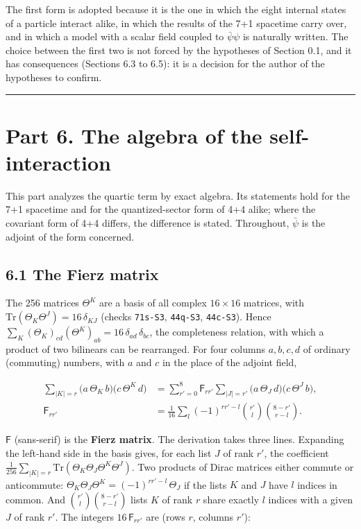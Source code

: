 \documentclass[
  10pt,
]{article}
\begin{document}
The first form is adopted because it is the one in which the eight
internal states of a particle interact alike, in which the results of
the 7+1 spacetime carry over, and in which a model with a scalar field
coupled to \(\bar\psi\psi\) is naturally written. The choice between the
first two is not forced by the hypotheses of Section 0.1, and it has
consequences (Sections 6.3 to 6.5): it is a decision for the author of
the hypotheses to confirm.

\begin{center}\rule{0.5\linewidth}{0.5pt}\end{center}

\hypertarget{part-6.-the-algebra-of-the-self-interaction}{%
\section{Part 6. The algebra of the
self-interaction}\label{part-6.-the-algebra-of-the-self-interaction}}

This part analyzes the quartic term by exact algebra. Its statements
hold for the 7+1 spacetime and for the quantized-sector form of 4+4
alike; where the covariant form of 4+4 differs, the difference is
stated. Throughout, \(\bar\psi\) is the adjoint of the form concerned.

\hypertarget{the-fierz-matrix}{%
\subsection{6.1 The Fierz matrix}\label{the-fierz-matrix}}

The 256 matrices \(\Theta^K\) are a basis of all complex \(16\times16\)
matrices, with \(\mathrm{Tr}(\Theta_K\Theta^J)=16\,\delta_{KJ}\) (checks
\texttt{71s-S3}, \texttt{44q-S3}, \texttt{44c-S3}). Hence
\(\sum_K(\Theta_K)_{cd}(\Theta^K)_{ab}=16\,\delta_{ad}\,\delta_{bc}\),
the completeness relation, with which a product of two bilinears can be
rearranged. For four columns \(a,b,c,d\) of ordinary (commuting)
numbers, with \(a\) and \(c\) in the place of the adjoint field,

\[\begin{aligned}
\sum_{|K|=r}\big(a\,\Theta_K\,b\big)\big(c\,\Theta^K\,d\big)
&=\sum_{r'=0}^{8}\mathsf F_{rr'}\sum_{|J|=r'}\big(a\,\Theta_J\,d\big)\big(c\,\Theta^J\,b\big),\\
\mathsf F_{rr'}&=\frac1{16}\sum_{l}(-1)^{rr'-l}\binom{r'}{l}\binom{8-r'}{r-l}.
\end{aligned}\tag{6.1}\]

\(\mathsf F\) (sans-serif) is the \textbf{Fierz matrix}. The derivation
takes three lines. Expanding the left-hand side in the basis gives, for
each list \(J\) of rank \(r'\), the coefficient
\(\tfrac1{256}\sum_{|K|=r}\mathrm{Tr}(\Theta_K\Theta_J\Theta^K\Theta^J)\).
Two products of Dirac matrices either commute or anticommute:
\(\Theta_K\Theta_J\Theta^K=(-1)^{rr'-l}\,\Theta_J\) if the lists \(K\)
and \(J\) have \(l\) indices in common. And
\(\binom{r'}{l}\binom{8-r'}{r-l}\) lists \(K\) of rank \(r\) share
exactly \(l\) indices with a given \(J\) of rank \(r'\). The integers
\(16\,\mathsf F_{rr'}\) are (rows \(r\), columns \(r'\)):
\end{document}
